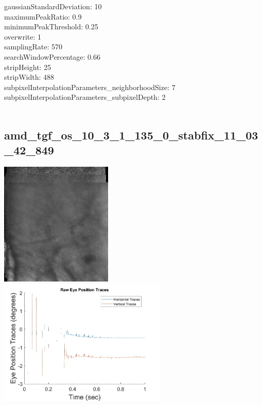 \documentclass[11pt]{article}
\begin{document}
gaussianStandardDeviation: 10\\
maximumPeakRatio: 0.9\\
minimumPeakThreshold: 0.25\\
overwrite: 1\\
samplingRate: 570\\
searchWindowPercentage: 0.66\\
stripHeight: 25\\
stripWidth: 488\\
subpixelInterpolationParameters\_neighborhoodSize: 7\\
subpixelInterpolationParameters\_subpixelDepth: 2\\
\\
\newpage

\subsection{amd\_tgf\_os\_10\_3\_1\_135\_0\_stabfix\_11\_03\_42\_849}
\includegraphics[width=0.40\textwidth, valign=m]{referenceframes/tslo_amd/amd_tgf_os_10_3_1_135_0_stabfix_11_03_42_849_dwt_nostim_gamscaled_bandfilt_refframe.jpg}
\includegraphics[width=0.60\textwidth, valign=m]{eyepositiontraces/tslo_amd/amd_tgf_os_10_3_1_135_0_stabfix_11_03_42_849.jpg}\\
\end{document}
